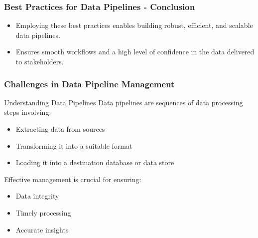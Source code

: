 \documentclass[aspectratio=169]{beamer}
\begin{document}
\begin{frame}[fragile]
    \frametitle{Best Practices for Data Pipelines - Conclusion}
    \begin{itemize}
        \item Employing these best practices enables building robust, efficient, and scalable data pipelines.
        \item Ensures smooth workflows and a high level of confidence in the data delivered to stakeholders.
    \end{itemize}
\end{frame}

\begin{frame}[fragile]
    \frametitle{Challenges in Data Pipeline Management}
    \begin{block}{Understanding Data Pipelines}
        Data pipelines are sequences of data processing steps involving:
        \begin{itemize}
            \item Extracting data from sources
            \item Transforming it into a suitable format
            \item Loading it into a destination database or data store
        \end{itemize}
        Effective management is crucial for ensuring:
        \begin{itemize}
            \item Data integrity
            \item Timely processing
            \item Accurate insights
        \end{itemize}
    \end{block}
\end{frame}
\end{document}

